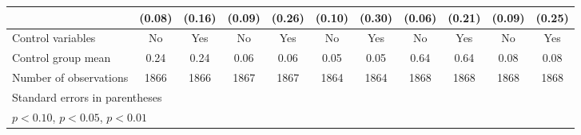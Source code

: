 {\begin{tabular}{l*{10}{c}}
                    &      (0.08)         &      (0.16)         &      (0.09)         &      (0.26)         &      (0.10)         &      (0.30)         &      (0.06)         &      (0.21)         &      (0.09)         &      (0.25)         \\
\hline
Control variables   &          No         &         Yes         &          No         &         Yes         &          No         &         Yes         &          No         &         Yes         &          No         &         Yes         \\
Control group mean  &        0.24         &        0.24         &        0.06         &        0.06         &        0.05         &        0.05         &        0.64         &        0.64         &        0.08         &        0.08         \\
Number of observations&        1866         &        1866         &        1867         &        1867         &        1864         &        1864         &        1868         &        1868         &        1868         &        1868         \\
\hline\hline
\multicolumn{11}{l}{\footnotesize Standard errors in parentheses}\\
\multicolumn{11}{l}{\footnotesize \sym{*} \(p<0.10\), \sym{**} \(p<0.05\), \sym{***} \(p<0.01\)}\\
\end{tabular}
}
